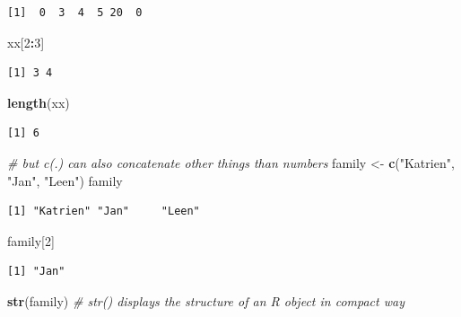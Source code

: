 \documentclass[
]{book}
\newenvironment{Shaded}{\begin{snugshade}}{\end{snugshade}}
\newcommand{\CommentTok}[1]{\textcolor[rgb]{0.56,0.35,0.01}{\textit{#1}}}
\newcommand{\DecValTok}[1]{\textcolor[rgb]{0.00,0.00,0.81}{#1}}
\newcommand{\KeywordTok}[1]{\textcolor[rgb]{0.13,0.29,0.53}{\textbf{#1}}}
\newcommand{\NormalTok}[1]{#1}
\newcommand{\OperatorTok}[1]{\textcolor[rgb]{0.81,0.36,0.00}{\textbf{#1}}}
\newcommand{\StringTok}[1]{\textcolor[rgb]{0.31,0.60,0.02}{#1}}
\begin{document}
\begin{verbatim}
[1]  0  3  4  5 20  0
\end{verbatim}

\begin{Shaded}
\begin{Highlighting}[]
\NormalTok{xx[}\DecValTok{2}\OperatorTok{:}\DecValTok{3}\NormalTok{]}
\end{Highlighting}
\end{Shaded}

\begin{verbatim}
[1] 3 4
\end{verbatim}

\begin{Shaded}
\begin{Highlighting}[]
\KeywordTok{length}\NormalTok{(xx)}
\end{Highlighting}
\end{Shaded}

\begin{verbatim}
[1] 6
\end{verbatim}

\begin{Shaded}
\begin{Highlighting}[]
\CommentTok{# but c(.) can also concatenate other things than numbers}
\NormalTok{family <-}\StringTok{ }\KeywordTok{c}\NormalTok{(}\StringTok{"Katrien"}\NormalTok{, }\StringTok{"Jan"}\NormalTok{, }\StringTok{"Leen"}\NormalTok{)}
\NormalTok{family}
\end{Highlighting}
\end{Shaded}

\begin{verbatim}
[1] "Katrien" "Jan"     "Leen"   
\end{verbatim}

\begin{Shaded}
\begin{Highlighting}[]
\NormalTok{family[}\DecValTok{2}\NormalTok{]}
\end{Highlighting}
\end{Shaded}

\begin{verbatim}
[1] "Jan"
\end{verbatim}

\begin{Shaded}
\begin{Highlighting}[]
\KeywordTok{str}\NormalTok{(family) }\CommentTok{# str() displays the structure of an R object in compact way}
\end{Highlighting}
\end{Shaded}
\end{document}
